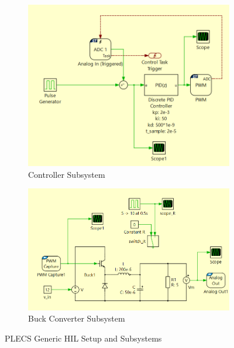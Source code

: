 \begin{figure}[htbp]
    \begin{subfigure}[b]{0.49\textwidth}
        \centering
        \includegraphics[width=\textwidth]{img/HIL/generic_control.png}
        \caption{Controller Subsystem}
        \label{fig:generic_controller}
    \end{subfigure}
    \hfill
    \begin{subfigure}[b]{0.49\textwidth}
        \centering
        \includegraphics[width=\textwidth]{img/HIL/generic_buck.png}
        \caption{Buck Converter Subsystem}
        \label{fig:generic_buck}
    \end{subfigure}

    \caption{PLECS Generic HIL Setup and Subsystems}
    \label{fig:HIL_setup}
\end{figure}


